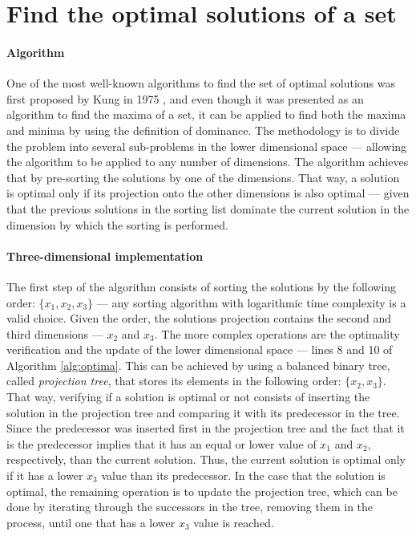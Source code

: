 \section{Find the optimal solutions of a set}

\paragraph{Algorithm} One of the most well-known algorithms to find the set of optimal solutions was first proposed by Kung in 1975 \cite{kung_optima}, and even though it was presented as an algorithm to find the maxima of a set, it can be applied to find both the maxima and minima by using the definition of dominance. The methodology is to divide the problem into several sub-problems in the lower dimensional space --- allowing the algorithm to be applied to any number of dimensions. The algorithm achieves that by pre-sorting the solutions by one of the dimensions. That way, a solution is optimal only if its projection onto the other dimensions is also optimal --- given that the previous solutions in the sorting list dominate the current solution in the dimension by which the sorting is performed.



\paragraph{Three-dimensional implementation} The first step of the algorithm consists of sorting the solutions by the following order: $\{x_1,x_2,x_3\}$ --- any sorting algorithm with logarithmic time complexity is a valid choice. Given the order, the solutions projection contains the second and third dimensions --- $x_2$ and $x_3$. The more complex operations are the optimality verification and the update of the lower dimensional space --- lines 8 and 10 of Algorithm \ref{alg:optima}. This can be achieved by using a balanced binary tree, called \textit{projection tree}, that stores its elements in the following order: $\{x_2,x_3\}$. That way, verifying if a solution is optimal or not consists of inserting the solution in the projection tree and comparing it with its predecessor in the tree. Since the predecessor was inserted first in the projection tree and the fact that it is the predecessor implies that it has an equal or lower value of $x_1$ and $x_2$, respectively, than the current solution. Thus, the current solution is optimal only if it has a lower $x_3$ value than its predecessor. In the case that the solution is optimal, the remaining operation is to update the projection tree, which can be done by iterating through the successors in the tree, removing them in the process, until one that has a lower $x_3$ value is reached.



